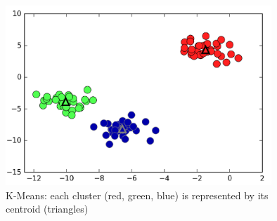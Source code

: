 \documentclass[12pt]{article} %
\begin{document}
	\begin{figure}
	\centering
	\includegraphics[width=10cm]{figuras/clusters.png}
	\caption{K-Means: each cluster (red, green, blue) is represented by its centroid (triangles)\cite{python}}
	\end{figure}
	
\end{document}
